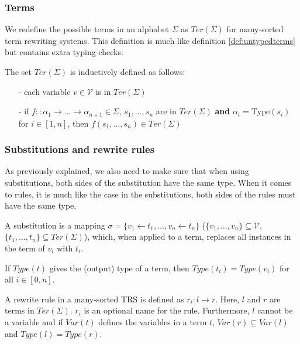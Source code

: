 \subsubsection{Terms}
We redefine the possible terms in an alphabet $\Sigma$ as $\textit{Ter}\left(\Sigma\right)$ for many-sorted term rewriting systems. This definition is much like definition \ref{def:untypedterms} but contains extra typing checks: 
\begin{definition}
The set $\textit{Ter}\left(\Sigma\right)$ is inductively defined as follows:
\begin{itemize}
    \itemsep -0.5em
    \item[-] each variable $v \in \mathcal{V}$ is in $\textit{Ter}\left(\Sigma\right)$
    \item[-] if $f :: \alpha_1 \rightarrow \dots \rightarrow \alpha_{n+1} \in \Sigma$, $s_1, \dots, s_n$ are in $\textit{Ter}\left(\Sigma\right)$ \textbf{and} $\alpha_i = \text{Type}(s_i)$ for $i \in [1, n]$, then $f(s_1, \dots, s_n) \in \textit{Ter}(\Sigma)$
\end{itemize}
\end{definition}

\subsubsection{Substitutions and rewrite rules}
As previously explained, we also need to make sure that when using substitutions, both sides of the substitution have the same type. When it comes to rules, it is much like the case in the substitutions, both sides of the rules must have the same type.
\begin{definition}
A substitution is a mapping $\sigma = \{ v_1 \leftarrow t_1, \dots, v_n \leftarrow t_n \}$ ($\{ v_1, \dots, v_n \} \subseteq \mathcal{V}$, $\{ t_1, \dots, t_n\} \subseteq \textit{Ter}(\Sigma)$), which, when applied to a term, replaces all instances in the term of $v_i$ with $t_i$.  

If $\textit{Type}(t)$ gives the (output) type of a term, then $\textit{Type}(t_i) = \textit{Type}(v_i)$ for all $i \in [ 0, n ]$.
\end{definition}

\begin{definition}
A rewrite rule in a many-sorted TRS is defined as $r_i : l \rightarrow r$. Here, $l$ and $r$ are terms in $\textit{Ter}(\Sigma)$. $r_i$ is an optional name for the rule. Furthermore, $l$ cannot be a variable and if $\textit{Var}(t)$ defines the variables in a term $t$, $\textit{Var}(r) \subseteq \textit{Var}(l)$ and \textbf{$\textit{Type}(l) = \textit{Type}(r)$}. 
\end{definition}

